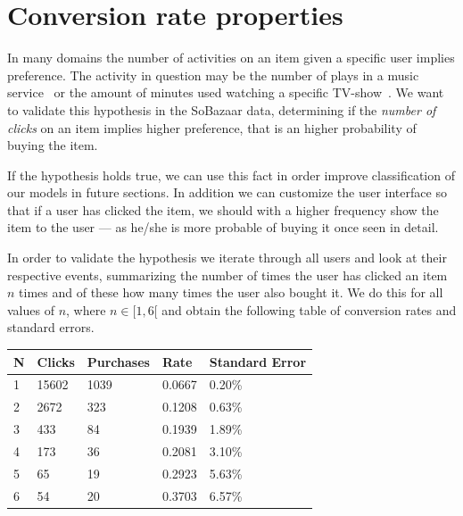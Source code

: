 

\clearpage
\section{Conversion rate properties}

In many domains the number of activities on an item given a specific user
implies preference. The activity in question may be the number of plays in a
music service~\cite{parra2011walk} or the amount of minutes used watching a
specific TV-show~\cite{study-on-implicit-tv}. We want to validate this
hypothesis in the SoBazaar data, determining if the \textit{number of clicks}
on an item implies higher preference, that is an higher probability of buying
the item.



If the hypothesis holds true, we can use this fact in order improve
classification of our models in future sections. In addition we can customize
the user interface so that if a user has clicked the item, we should with a
higher frequency show the item to the user --- as he/she is more probable of
buying it once seen in detail.

In order to validate the hypothesis we iterate through all users and look at
their respective events, summarizing the number of times the user has clicked
an item $n$ times and of these how many times the user also bought it. We do
this for all values of $n$, where $n \in [1,6[$ and obtain the following table
of conversion rates and standard errors.

\begin{table}[H]
  \centering
  \begin{tabular}{lllll}
    \toprule
    N & Clicks & Purchases & Rate & Standard Error \\
    \midrule
    1 & 15602 & 1039  & 0.0667 & 0.20\% \\
    2 & 2672  & 323   & 0.1208 & 0.63\% \\
    3 & 433   & 84    & 0.1939 & 1.89\% \\
    4 & 173   & 36    & 0.2081 & 3.10\% \\
    5 & 65    & 19    & 0.2923 & 5.63\% \\
    6 & 54    & 20    & 0.3703 & 6.57\% \\
    \bottomrule
  \end{tabular}
\end{table}

